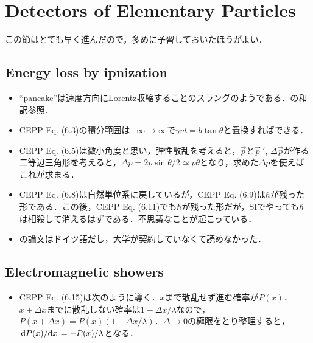 \section{Detectors of Elementary Particles}
この節はとても早く進んだので，多めに予習しておいたほうがよい．
\subsection{Energy loss by ipnization}
\begin{itemize}
		\item ``pancake''は速度方向にLorentz収縮することのスラングのようである．\cite{Pes:2022}の和訳参照．
		\item CEPP Eq. (6.3)の積分範囲は$-\infty \to \infty$で$\gamma vt = b\tan\theta $と置換すればできる．
		\item CEPP Eq. (6.5)は微小角度と思い，弾性散乱を考えると，$\vec{p} $と$\vec{p}\ \!'$, $\varDelta \vec{p} $が作る二等辺三角形を考えると，$\varDelta p = 2p\sin\theta/2\simeq p\theta$となり，求めた$\varDelta p $を使えばこれが求まる．
		\item CEPP Eq. (6.8)は自然単位系に戻しているが，CEPP Eq. (6.9)は$\hbar $が残った形である．この後，CEPP Eq. (6.11)でも$\hbar $が残った形だが，SIでやっても$\hbar $は相殺して消えるはずである．不思議なことが起こっている．
		\item \cite{Bethe1930}の論文はドイツ語だし，大学が契約していなくて読めなかった．
\end{itemize}
\subsection{Electromagnetic showers}
\begin{itemize}
		\item CEPP Eq. (6.15)は次のように導く．$x $まで散乱せず進む確率が$P(x) $．$x + \varDelta x $までに散乱しない確率は$1-\varDelta x /\lambda$なので，$P(x + \varDelta x) = P(x)(1-\varDelta x/\lambda) $．$\varDelta \to 0 $の極限をとり整理すると，$\dv*{P(x)}{x} = -P(x)/\lambda $となる．
\end{itemize}
